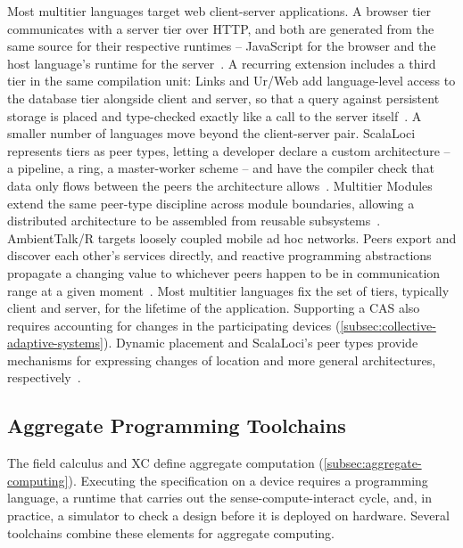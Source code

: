 Most multitier languages target web client-server applications.
A browser tier communicates with a server tier over HTTP, and both are generated from the same source for their respective runtimes -- JavaScript for the browser and the host language's runtime for the server~\cite{DBLP:journals/csur/WeisenburgerWS20}.
%
A recurring extension includes a third tier in the same compilation unit:
Links and Ur/Web add language-level access to the database tier alongside client and server,
so that a query against persistent storage is placed and type-checked exactly like a call to the server itself~\cite{DBLP:conf/fmco/CooperLWY06,10.1145/2676726.2677004}.
%
A smaller number of languages move beyond the client-server pair.
%
ScalaLoci represents tiers as peer types,
letting a developer declare a custom architecture -- a pipeline, a ring, a master-worker scheme -- and have the compiler check that data only flows between the peers the architecture allows~\cite{DBLP:journals/pacmpl/WeisenburgerKS18}.
%
Multitier Modules extend the same peer-type discipline across module boundaries,
allowing a distributed architecture to be assembled from reusable subsystems~\cite{Weisenburger:2019:Multitier}.
%
AmbientTalk/R targets loosely coupled mobile ad hoc networks.
Peers export and discover each other's services directly,
and reactive programming abstractions propagate a changing value to whichever peers happen to be in communication range at a given moment~\cite{DBLP:conf/tools/CarretonMCM10}.
%
Most multitier languages fix the set of tiers, typically client and server, for the lifetime of the application.
Supporting a \ac{CAS} also requires accounting for changes in the participating devices (\cref{subsec:collective-adaptive-systems}).
%
Dynamic placement and ScalaLoci's peer types provide mechanisms for expressing changes of location and more general architectures,
respectively~\cite{Zakhour:2023:TypeSafe,DBLP:journals/pacmpl/WeisenburgerKS18}.

\subsection{Aggregate Programming Toolchains}
\label{subsec:cas-platforms}

The field calculus and XC define aggregate computation (\cref{subsec:aggregate-computing}).
%
Executing the specification on a device requires a programming language,
a runtime that carries out the sense-compute-interact cycle,
and, in practice, a simulator to check a design before it is deployed on hardware.
%
Several toolchains combine these elements for aggregate computing.

